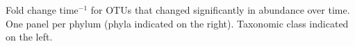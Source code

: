 Fold change time$^{-1}$ for OTUs that changed significantly in abundance over time. One panel per phylum (phyla indicated on the right). Taxonomic class indicated on the left.